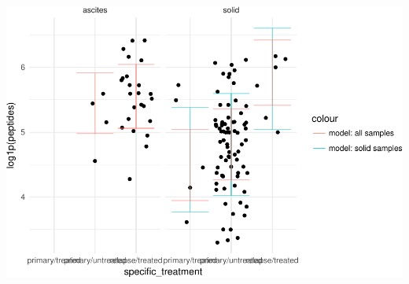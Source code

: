 \documentclass[]{article}
\begin{document}
\includegraphics{Hierarchical_model_mutations_and_peptides_files/figure-latex/allsamp-peptides-ppred-1.pdf}
\end{document}
